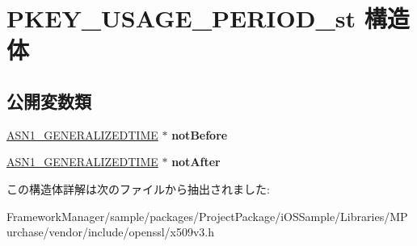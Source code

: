 \hypertarget{struct_p_k_e_y___u_s_a_g_e___p_e_r_i_o_d__st}{}\section{P\+K\+E\+Y\+\_\+\+U\+S\+A\+G\+E\+\_\+\+P\+E\+R\+I\+O\+D\+\_\+st 構造体}
\label{struct_p_k_e_y___u_s_a_g_e___p_e_r_i_o_d__st}
\subsection*{公開変数類}
\begin{DoxyCompactItemize}
\item 
\hypertarget{struct_p_k_e_y___u_s_a_g_e___p_e_r_i_o_d__st_a242441661347dbe5bb0006a542f39d2c}{}\hyperlink{structasn1__string__st}{A\+S\+N1\+\_\+\+G\+E\+N\+E\+R\+A\+L\+I\+Z\+E\+D\+T\+I\+M\+E} $\ast$ {\bfseries not\+Before}\label{struct_p_k_e_y___u_s_a_g_e___p_e_r_i_o_d__st_a242441661347dbe5bb0006a542f39d2c}

\item 
\hypertarget{struct_p_k_e_y___u_s_a_g_e___p_e_r_i_o_d__st_afe94d8f367b6bfb458c1df5081908cac}{}\hyperlink{structasn1__string__st}{A\+S\+N1\+\_\+\+G\+E\+N\+E\+R\+A\+L\+I\+Z\+E\+D\+T\+I\+M\+E} $\ast$ {\bfseries not\+After}\label{struct_p_k_e_y___u_s_a_g_e___p_e_r_i_o_d__st_afe94d8f367b6bfb458c1df5081908cac}

\end{DoxyCompactItemize}


この構造体詳解は次のファイルから抽出されました\+:\begin{DoxyCompactItemize}
\item 
Framework\+Manager/sample/packages/\+Project\+Package/i\+O\+S\+Sample/\+Libraries/\+M\+Purchase/vendor/include/openssl/x509v3.\+h\end{DoxyCompactItemize}
